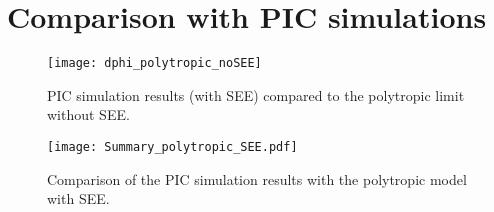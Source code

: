 \FloatBarrier

\section{Comparison with PIC simulations} \label{subsec-picandmodel}

\begin{figure}[hbtp]
  \centering
  \texttt{[image: dphi\_polytropic\_noSEE]}
  \caption{PIC simulation results (with SEE) compared to the polytropic limit without SEE.}
  \label{fig-polytropic_pic_noSEE}
\end{figure}

\begin{figure}[hbtp]
  \centering
  \texttt{[image: Summary\_polytropic\_SEE.pdf]}
  \caption{Comparison of the PIC simulation results with the polytropic model with SEE.}
  \label{fig-polytropic_see_summary}
\end{figure}


